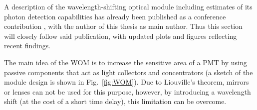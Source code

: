 % 
% 

A description of the wavelength-shifting optical module including estimates of
its photon detection capabilities has already been published as a conference
contribution \cite{WOM_ICRC}, with the author of this thesis as main author.
Thus this section will closely follow said publication, with updated plots and
figures reflecting recent findings.

The main idea of the WOM is to increase the sensitive area of a PMT by using 
passive components that act as light collectors and concentrators (a sketch of 
the module design is shown in Fig.~\ref{fig:WOM}). Due to Liouville's theorem, 
mirrors or lenses can not be used for this purpose, however, by introducing a 
wavelength shift (at the cost of a short time delay), this limitation can be 
overcome.

